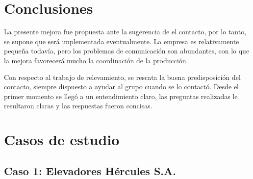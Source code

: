 \documentclass[a4paper,10pt]{article}
\begin{document}
\section{Conclusiones}
La presente mejora fue propuesta ante la sugerencia de el contacto, por lo tanto, se supone que será
implementada eventualmente. La empresa es relativamente pequeña todavía, pero los problemas de comunicación
son abundantes, con lo que la mejora favorecerá mucho la coordinación de la producción.

Con respecto al trabajo de relevamiento, se rescata la buena predisposición del contacto, siempre
dispuesto a ayudar al grupo cuando se lo contactó. Desde el primer momento se llegó a un entendimiento
claro, las preguntas realizadas le resultaron claras y las respuestas fueron concisas.
\newpage
\section{Casos de estudio}
	\subsection{Caso 1: Elevadores Hércules S.A.}
\end{document}
